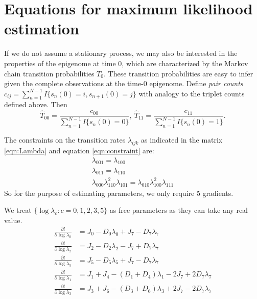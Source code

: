 \documentclass[11pt]{article}
\begin{document}
\section{Equations for maximum likelihood estimation}

If we do not assume a stationary process, we may also be interested in
the properties of the epigenome at time 0, which are characterized by
the Markov chain transition
probabilities $T_{0}$. These transition probabilities are easy to
infer given the complete observations at the time-0 epigenome.  Define
{\it pair counts} $c_{ij} = \sum_{n=1}^{N-1}I\{s_n(0) =i,
s_{n+1}(0)=j\}$ with analogy to the triplet counts defined above. Then
\[
\hat{T}_{00} = \frac{c_{00}}{\sum_{n=1}^{N-1}I\{s_n(0) = 0\}}, ~
\hat{T}_{11} = \frac{c_{11}}{\sum_{n=1}^{N-1}I\{s_n(0) = 1\}}.
\]

The constraints on the transition rates $\lambda_{ijk}$ as indicated
in the matrix \eqref{eqn:Lambda} and equation \eqref{eqn:constraint}
are:
\begin{equation}\label{eqn:constraints}
  \begin{array}{c}
    \lambda_{001} = \lambda_{100}\\
    \lambda_{011} = \lambda_{110}\\
    \lambda_{000}\lambda_{110}^2\lambda_{101} = \lambda_{010}\lambda_{100}^2\lambda_{111}
  \end{array}
\end{equation}
So for the purpose of estimating parameters, we only require 5
gradients.

We treat $\{\log\lambda_c: c = 0,1,2,3,5\}$ as free parameters as they
can take any real value.
\begin{equation}
  \begin{aligned}
    \frac{\partial l}{\partial \log\lambda_0} &= J_0 - D_0\lambda_0 + J_7 - D_7\lambda_7\\
    \frac{\partial l}{\partial \log\lambda_2} &= J_2 - D_2\lambda_2 - J_7 + D_7\lambda_7 \\
    \frac{\partial l}{\partial \log\lambda_5} &= J_5 - D_5\lambda_5 + J_7 - D_7\lambda_7\\
    \frac{\partial l}{\partial \log\lambda_1} &= J_1 + J_4 - (D_1 + D_4)\lambda_1 - 2J_7 + 2D_7\lambda_7\\
    \frac{\partial l}{\partial \log\lambda_3} &= J_3 + J_6 - (D_3 + D_6)\lambda_3 + 2J_7 - 2D_7\lambda_7
  \end{aligned}
\end{equation}
\end{document}
